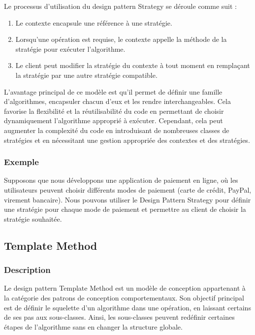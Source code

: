 Le processus d'utilisation du design pattern Strategy se déroule comme suit :

\begin{enumerate}[leftmargin=*,labelsep=3mm]
    \item Le contexte encapsule une référence à une stratégie.
    \item Lorsqu'une opération est requise, le contexte appelle la méthode de la stratégie pour exécuter l'algorithme.
    \item Le client peut modifier la stratégie du contexte à tout moment en remplaçant la stratégie par une autre stratégie compatible.
\end{enumerate}

L'avantage principal de ce modèle est qu'il permet de définir une famille d'algorithmes, encapsuler chacun d'eux et les rendre interchangeables. Cela favorise la flexibilité et la réutilisabilité du code en permettant de choisir dynamiquement l'algorithme approprié à exécuter. Cependant, cela peut augmenter la complexité du code en introduisant de nombreuses classes de stratégies et en nécessitant une gestion appropriée des contextes et des stratégies.


\subsubsection{Exemple}

Supposons que nous développons une application de paiement en ligne, où les utilisateurs peuvent choisir différents modes de paiement (carte de crédit, PayPal, virement bancaire). Nous pouvons utiliser le Design Pattern Strategy pour définir une stratégie pour chaque mode de paiement et permettre au client de choisir la stratégie souhaitée.




\newpage

\subsection{Template Method}

\subsubsection{Description}

Le design pattern Template Method est un modèle de conception appartenant à la catégorie des patrons de conception comportementaux. Son objectif principal est de définir le squelette d'un algorithme dans une opération, en laissant certains de ses pas aux sous-classes. Ainsi, les sous-classes peuvent redéfinir certaines étapes de l'algorithme sans en changer la structure globale.

